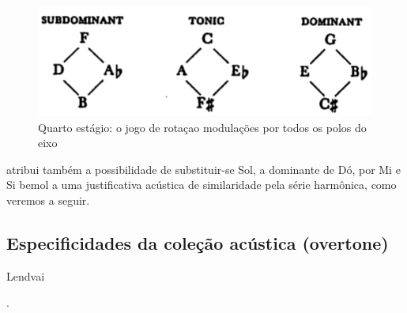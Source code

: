 \documentclass[
	12pt,				%
	openright,			%
	twoside,			%
	a4paper,			%
	english,			%
	french,				%
	spanish,			%
	brazil				%
	]{abntex2}
\begin{document}
\begin{figure}[!h]
	\caption{\label{fig_grafico}Quarto estágio: o jogo de rotaçao modulações por todos os polos do eixo }
	\begin{center}
	    \includegraphics[scale=0.5]{axis/estagio04.png}
	\end{center}
\end{figure}

 atribui também a possibilidade de substituir-se Sol, a dominante de Dó, por Mi e Si bemol a uma justificativa acústica de similaridade pela série harmônica, como veremos a seguir. 




\subsection{Especificidades da coleção acústica (overtone)}

Lendvai









.


\end{document}
